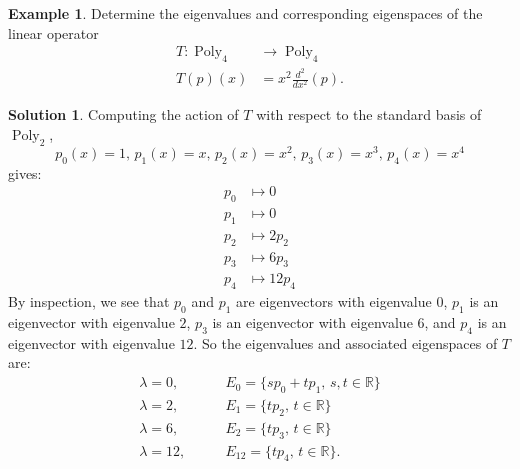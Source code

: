 \documentclass[a4paper,11pt]{book}
\theoremstyle{definition}
\newtheorem{example_environment}{Example}[chapter]
\newtheorem*{solution}{Solution}
\newenvironment{example}
	{
		\begin{oframed} 
		\begin{example_environment}
	}
	{
		\end{example_environment}
		\end{oframed}
	}
\DeclareMathOperator{\Poly}{Poly}
\begin{document}
\begin{example} Determine the eigenvalues and corresponding eigenspaces of the linear operator
\begin{align*}
 T : \Poly_4 & \rightarrow \Poly_4 \\
  T(p)(x) &= x^2 \frac{d^2}{dx^2} (p). 
\end{align*}
\begin{solution}
Computing the action of $T$ with respect to the standard basis of $\Poly_2$,
\[
 p_0(x) = 1, \, p_1 (x) = x, \, p_2(x) = x^2, \, p_3(x) = x^3, \, p_4(x) = x^4
\]
gives:
\begin{align*}
 p_0 & \mapsto 0 \\
 p_1 & \mapsto 0 \\
 p_2 & \mapsto 2p_2 \\
 p_3 &\mapsto 6p_3 \\
 p_4 & \mapsto 12 p_4 
\end{align*}
By inspection, we see that $p_0$ and $p_1$ are eigenvectors with eigenvalue $0$, $p_1$ is an eigenvector with eigenvalue $2$, $p_3$ is an eigenvector with eigenvalue $6$, and $p_4$ is an eigenvector with eigenvalue $12$. So the eigenvalues and associated eigenspaces of $T$ are:
\begin{align*}
 \lambda = 0, & \qquad E_0 = \{s p_0 + t p_1, \, s,t \in \mathbb{R} \} \\
 \lambda = 2, & \qquad E_1 = \{t p_2, \, t \in \mathbb{R} \} \\
 \lambda = 6, & \qquad E_2 = \{t p_3, \, t \in \mathbb{R} \} \\
 \lambda = 12, & \qquad E_12 = \{t p_4, \, t \in \mathbb{R} \}. 
\end{align*}
\end{solution}

\end{example}
\end{document}
